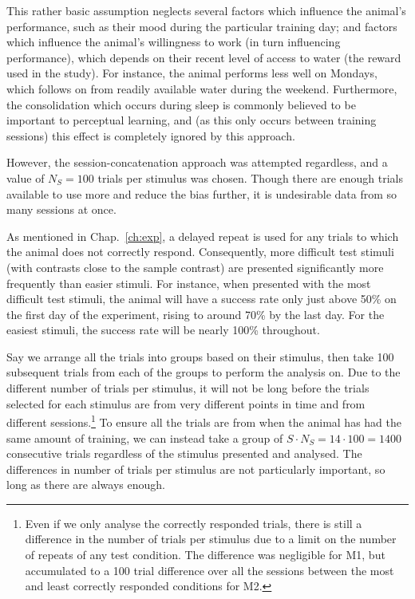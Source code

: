 This rather basic assumption neglects several factors which influence the animal's performance, such as their mood during the particular training day; and factors which influence the animal's willingness to work (in turn influencing performance), which depends on their recent level of access to water (the reward used in the study).
For instance, the animal performs less well on Mondays, which follows on from readily available water during the weekend.
Furthermore, the consolidation which occurs during sleep is commonly believed to be important to perceptual learning, and (as this only occurs between training sessions) this effect is completely ignored by this approach.

However, the session-concatenation approach was attempted regardless, and a value of $N_S = 100$ trials per stimulus was chosen.
Though there are enough trials available to use more and reduce the bias further, it is undesirable data from so many sessions at once.

As mentioned in Chap.~\ref{ch:exp}, a delayed repeat is used for any trials to which the animal does not correctly respond.
Consequently, more difficult test stimuli (with contrasts close to the sample contrast) are presented significantly more frequently than easier stimuli.
For instance, when presented with the most difficult test stimuli, the animal will have a success rate only just above 50\% on the first day of the experiment, rising to around 70\% by the last day.
For the easiest stimuli, the success rate will be nearly 100\% throughout.

Say we arrange all the trials into groups based on their stimulus, then take 100 subsequent trials from each of the groups to perform the analysis on.
Due to the different number of trials per stimulus, it will not be long before the trials selected for each stimulus are from very different points in time and from different sessions.\footnote{Even if we only analyse the correctly responded trials, there is still a difference in the number of trials per stimulus due to a limit on the number of repeats of any test condition.
The difference was negligible for \ac{M1}, but accumulated to a 100 trial difference over all the sessions between the most and least correctly responded conditions for \ac{M2}.}
To ensure all the trials are from when the animal has had the same amount of training, we can instead take a group of $S \cdot N_S = 14 \cdot 100 = 1400$ consecutive trials regardless of the stimulus presented and analysed.
The differences in number of trials per stimulus are not particularly important, so long as there are always  enough.

